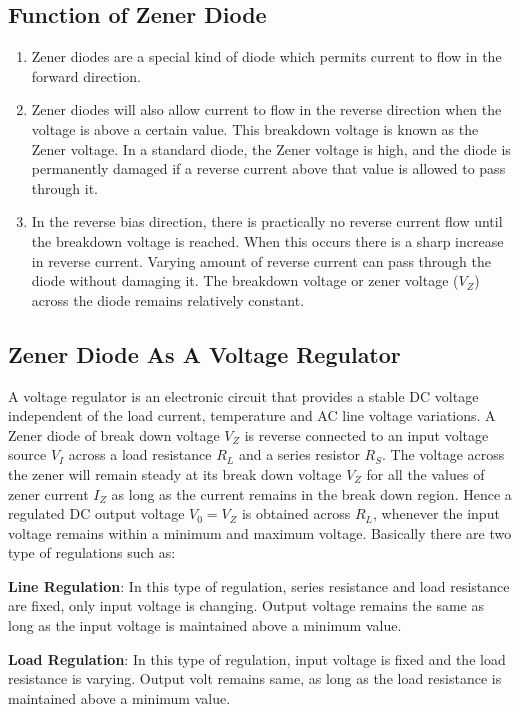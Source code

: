 		\subsection{Function of Zener Diode}
			\begin{enumerate}
				\item Zener diodes are a special kind of diode which permits current to flow in the forward direction.
				\item Zener diodes will also allow current to flow in the reverse direction when the voltage is above a certain value. This breakdown voltage is known as the Zener voltage. In a standard diode, the Zener voltage is high, and the diode is permanently damaged if a reverse current above that value is allowed to pass through it.
				\item In the reverse bias direction, there is practically no reverse current flow until the breakdown voltage is reached. When this occurs there is a sharp increase in reverse current. Varying amount of reverse current can pass through the diode without damaging it. The breakdown voltage or zener voltage (\(V_Z\)) across the diode remains relatively constant. 
			\end{enumerate}
		
		\subsection{Zener Diode As A Voltage Regulator}
			A voltage regulator is an electronic circuit that provides a stable DC voltage independent of the load current, temperature and AC line voltage variations. A Zener diode of break down voltage \(V_Z\) is reverse connected to an input voltage source \(V_I\) across a load resistance \(R_L\) and a series resistor \(R_S\). The voltage across the zener will remain steady at its break down voltage \(V_Z\) for all the values of zener current \(I_Z\)  as long as the current remains in the break down region. Hence a regulated DC output voltage \(V_0 = V_Z\) is obtained across \(R_L\), whenever the input voltage remains within a minimum and maximum voltage. Basically there are two type of regulations such as:
			
			\textbf{Line Regulation}: In this type of regulation, series resistance and load resistance are fixed, only input voltage is changing. Output voltage remains the same as long as the input voltage is maintained above a minimum value.
			
			\textbf{Load Regulation}: In this type of regulation, input voltage is fixed and the load resistance is varying. Output volt remains same, as long as the load resistance is maintained above a minimum value.
			
